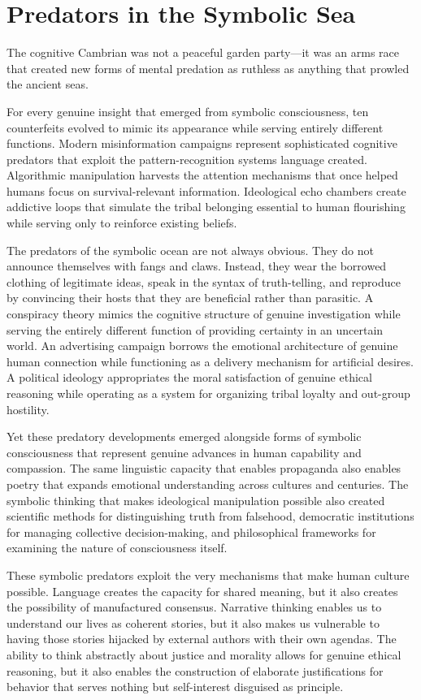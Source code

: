 \section{Predators in the Symbolic Sea}

The cognitive Cambrian was not a peaceful garden party—it was an arms race that created new forms of mental predation as ruthless as anything that prowled the ancient seas.

For every genuine insight that emerged from symbolic consciousness, ten counterfeits evolved to mimic its appearance while serving entirely different functions. Modern misinformation campaigns represent sophisticated cognitive predators that exploit the pattern-recognition systems language created. Algorithmic manipulation harvests the attention mechanisms that once helped humans focus on survival-relevant information. Ideological echo chambers create addictive loops that simulate the tribal belonging essential to human flourishing while serving only to reinforce existing beliefs.

The predators of the symbolic ocean are not always obvious. They do not announce themselves with fangs and claws. Instead, they wear the borrowed clothing of legitimate ideas, speak in the syntax of truth-telling, and reproduce by convincing their hosts that they are beneficial rather than parasitic. A conspiracy theory mimics the cognitive structure of genuine investigation while serving the entirely different function of providing certainty in an uncertain world. An advertising campaign borrows the emotional architecture of genuine human connection while functioning as a delivery mechanism for artificial desires. A political ideology appropriates the moral satisfaction of genuine ethical reasoning while operating as a system for organizing tribal loyalty and out-group hostility.

Yet these predatory developments emerged alongside forms of symbolic consciousness that represent genuine advances in human capability and compassion. The same linguistic capacity that enables propaganda also enables poetry that expands emotional understanding across cultures and centuries. The symbolic thinking that makes ideological manipulation possible also created scientific methods for distinguishing truth from falsehood, democratic institutions for managing collective decision-making, and philosophical frameworks for examining the nature of consciousness itself.

These symbolic predators exploit the very mechanisms that make human culture possible. Language creates the capacity for shared meaning, but it also creates the possibility of manufactured consensus. Narrative thinking enables us to understand our lives as coherent stories, but it also makes us vulnerable to having those stories hijacked by external authors with their own agendas. The ability to think abstractly about justice and morality allows for genuine ethical reasoning, but it also enables the construction of elaborate justifications for behavior that serves nothing but self-interest disguised as principle.

